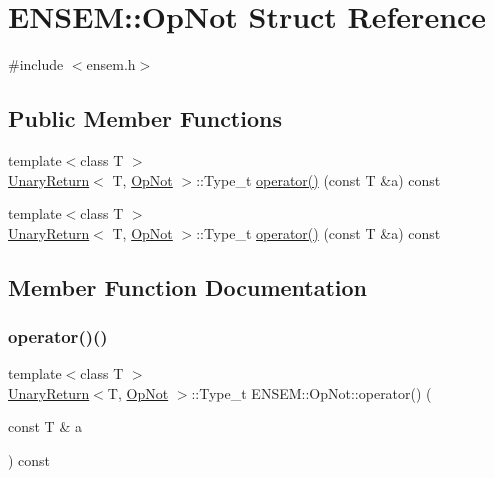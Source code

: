 \hypertarget{structENSEM_1_1OpNot}{}\section{E\+N\+S\+EM\+:\+:Op\+Not Struct Reference}
\label{structENSEM_1_1OpNot}


{\ttfamily \#include $<$ensem.\+h$>$}

\subsection*{Public Member Functions}
\begin{DoxyCompactItemize}
\item 
{\footnotesize template$<$class T $>$ }\\\mbox{\hyperlink{structENSEM_1_1UnaryReturn}{Unary\+Return}}$<$ T, \mbox{\hyperlink{structENSEM_1_1OpNot}{Op\+Not}} $>$\+::Type\+\_\+t \mbox{\hyperlink{structENSEM_1_1OpNot_a0e48693c476abfbda4c8abafefe17ad9}{operator()}} (const T \&a) const
\item 
{\footnotesize template$<$class T $>$ }\\\mbox{\hyperlink{structENSEM_1_1UnaryReturn}{Unary\+Return}}$<$ T, \mbox{\hyperlink{structENSEM_1_1OpNot}{Op\+Not}} $>$\+::Type\+\_\+t \mbox{\hyperlink{structENSEM_1_1OpNot_a0e48693c476abfbda4c8abafefe17ad9}{operator()}} (const T \&a) const
\end{DoxyCompactItemize}


\subsection{Member Function Documentation}
\mbox{\label{structENSEM_1_1OpNot_a0e48693c476abfbda4c8abafefe17ad9}} 
\subsubsection{\texorpdfstring{operator()()}{operator()()}\hspace{0.1cm}{\footnotesize\ttfamily [1/2]}}
{\footnotesize\ttfamily template$<$class T $>$ \\
\mbox{\hyperlink{structENSEM_1_1UnaryReturn}{Unary\+Return}}$<$T, \mbox{\hyperlink{structENSEM_1_1OpNot}{Op\+Not}} $>$\+::Type\+\_\+t E\+N\+S\+E\+M\+::\+Op\+Not\+::operator() (\begin{DoxyParamCaption}\item[{const T \&}]{a }\end{DoxyParamCaption}) const\hspace{0.3cm}{\ttfamily [inline]}}

